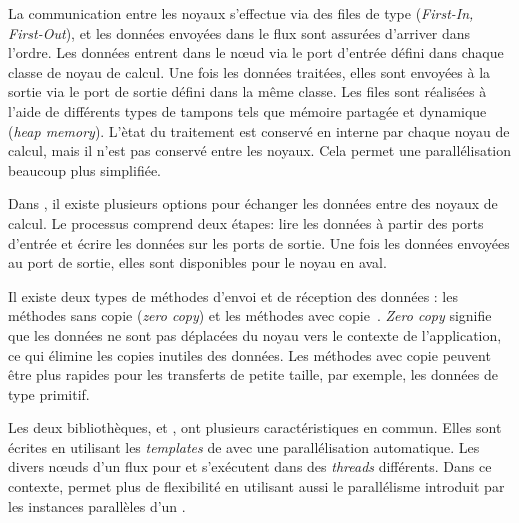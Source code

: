 La communication entre les noyaux s'effectue via des files de type  (\emph{First-In, First-Out}), et les donn\'ees envoy\'ees dans le flux sont assurées d'arriver dans l'ordre. Les donn\'ees entrent dans le nœud via le port d'entr\'ee d\'efini dans chaque classe de noyau de calcul. Une fois les donn\'ees trait\'ees, elles sont envoy\'ees \`a la sortie via le port de sortie d\'efini dans la m\^eme classe.  Les files sont réalisées \`a l'aide de diff\'erents types de tampons tels que m\'emoire partag\'ee et dynamique (\emph{heap memory}). L'\`etat du traitement est conserv\'e en interne par chaque noyau de calcul, mais il n'est pas conserv\'e entre les noyaux. Cela permet une parall\'elisation beaucoup plus simplifi\'ee.


%
Dans , il existe plusieurs options pour \'echanger les donn\'ees entre des noyaux de calcul. Le processus comprend deux \'etapes: lire les donn\'ees \`a partir des ports d'entr\'ee et \'ecrire les donn\'ees sur les ports de sortie. Une fois les données envoy\'ees au port de sortie, elles sont disponibles pour le noyau en aval.



Il existe deux types de m\'ethodes d'envoi et de r\'eception des donn\'ees : les m\'ethodes sans copie (\emph{zero copy}) et les m\'ethodes avec copie~\citep{accessingDataInRaftLib}. \emph{Zero copy} signifie que les donn\'ees ne sont pas d\'eplac\'ees du noyau vers le contexte de l'application, ce qui \'elimine les copies inutiles des donn\'ees. Les m\'ethodes avec copie peuvent \^etre plus rapides pour les transferts de petite taille, par exemple, les donn\'ees de type primitif.
%


Les deux biblioth\`eques,  et , ont plusieurs caract\'eristiques en commun. Elles sont \'ecrites en utilisant les \emph{templates} de  avec une parall\'elisation automatique. Les divers nœuds d'un flux pour  et  s'ex\'ecutent dans des \emph{threads} diff\'erents. Dans ce contexte,  permet plus de flexibilit\'e en utilisant aussi le parall\'elisme introduit par les instances parall\`eles d'un . 

